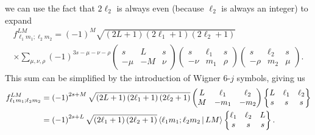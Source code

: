 \documentclass[a4paper,twocolumn,unpublished]{quantumarticle}
\newcommand{\p}[1]{\left(#1\right)} %
\newcommand{\bk}{\Braket} %
\begin{document}
we can use the fact that $2\ell_2$ is always even (because $\ell_2$ is always an integer) to expand
\begin{multline}
  f_{\ell_1 m_1;\ell_2 m_2}^{LM}
  = \p{-1}^M \sqrt{\p{2L+1}\p{2\ell_1+1}\p{2\ell_2+1}} \\
  \times \sum_{\mu,\nu,\rho} \p{-1}^{3s-\mu-\nu-\rho}
  \begin{pmatrix}
    s & L & s \\
    -\mu & -M & \nu
  \end{pmatrix}
  \begin{pmatrix}
    s & \ell_1 & s \\
    -\nu & m_1 & \rho
  \end{pmatrix}
  \begin{pmatrix}
    s & \ell_2 & s \\
    -\rho & m_2 & \mu
  \end{pmatrix}.
\end{multline}
This sum can be simplified by the introduction of Wigner 6-$j$ symbols, giving us
\begin{align}
  f_{\ell_1 m_1;\ell_2 m_2}^{LM}
  &= \p{-1}^{2s+M} \sqrt{\p{2L+1}\p{2\ell_1+1}\p{2\ell_2+1}}
  \begin{pmatrix}
    L & \ell_1 & \ell_2 \\
    M & -m_1 & -m_2
  \end{pmatrix}
  \begin{Bmatrix}
    L & \ell_1 & \ell_2 \\
    s & s & s
  \end{Bmatrix} \\
  &= \p{-1}^{2s+L} \sqrt{\p{2\ell_1+1}\p{2\ell_2+1}}
  \bk{\ell_1 m_1; \ell_2 m_2| LM}
  \begin{Bmatrix}
    \ell_1 & \ell_2 & L \\
    s & s & s
  \end{Bmatrix}.
\end{align}
\end{document}
